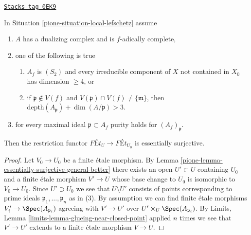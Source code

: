 \begin{lemma}
\label{pione-lemma-equivalence-better}
\href{https://stacks.math.columbia.edu/tag/0EK9}{\texttt{Stacks tag 0EK9}}

In Situation \ref{pione-situation-local-lefschetz} assume
\begin{enumerate}
\item $A$ has a dualizing complex and is $f$-adically complete,
\item one of the following is true
\begin{enumerate}
\item $A_f$ is $(S_2)$ and every irreducible component of $X$
not contained in $X_0$ has dimension $\geq 4$, or
\item if $\mathfrak p \not \in V(f)$ and
$V(\mathfrak p) \cap V(f) \not = \{\mathfrak m\}$, then
$\text{depth}(A_\mathfrak p) + \dim(A/\mathfrak p) > 3$.
\end{enumerate}
\item for every maximal ideal $\mathfrak p \subset A_f$
purity holds for $(A_f)_\mathfrak p$.
\end{enumerate}
Then the restriction functor $\textit{F\'Et}_U \to \textit{F\'Et}_{U_0}$
is essentially surjective.
\end{lemma}

\begin{proof}

Let $V_0 \to U_0$ be a finite \'etale morphism. By
Lemma \ref{pione-lemma-essentially-surjective-general-better}
there exists an open $U' \subset U$ containing $U_0$ and
a finite \'etale morphism $V' \to U$ whose base change to $U_0$
is isomorphic to $V_0 \to U_0$. Since $U' \supset U_0$
we see that $U \setminus U'$ consists of points corresponding
to prime ideals $\mathfrak p_1, \ldots, \mathfrak p_n$ as in (3).
By assumption we can find finite \'etale morphisms
$V'_i \to \Spec(A_{\mathfrak p_i})$ agreeing with
$V' \to U'$ over $U' \times_U \Spec(A_{\mathfrak p_i})$.
By Limits, Lemma \ref{limits-lemma-glueing-near-closed-point}
applied $n$ times we see that $V' \to U'$ extends to a finite \'etale
morphism $V \to U$.
\end{proof}

